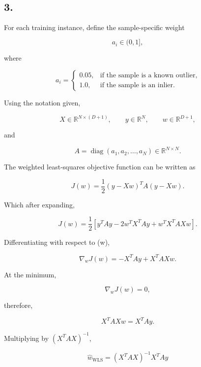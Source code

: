 \documentclass[11pt]{article}
\begin{document}
    \begin{center}
    \end{center}
    { \hspace*{\fill} \\}
    
    \subsection{3.}

For each training instance, define the sample-specific weight

\[
a_i \in (0,1],
\]

where

\[
a_i =
\begin{cases}
0.05, & \text{if the sample is a known outlier},\\
1.0, & \text{if the sample is an inlier}.
\end{cases}
\]

Using the notation given,

\[
X \in \mathbb{R}^{N\times(D+1)},
\qquad
y \in \mathbb{R}^{N},
\qquad
w \in \mathbb{R}^{D+1},
\]

and

\[
A=\operatorname{diag}(a_1,a_2,\ldots,a_N)
\in
\mathbb{R}^{N\times N}.
\]

The weighted least-squares objective function can be written as

\[
J(w)
=
\frac{1}{2}
(y-Xw)^T A(y-Xw).
\]

Which after expanding,

\[
J(w)
=
\frac{1}{2}
\left[
y^TAy
-
2w^TX^TAy
+
w^TX^TAXw
\right].
\]

Differentiating with respect to (w),

\[
\nabla_w J(w)
=
-X^TAy+X^TAXw.
\]

At the minimum,

\[
\nabla_wJ(w)=0,
\]

therefore,

\[
X^TAXw=X^TAy.
\]

Multiplying by \((X^TAX)^{-1}\),

\[
\hat{w}_{\mathrm{WLS}}
=
(X^TAX)^{-1}X^TAy
\]
\end{document}

